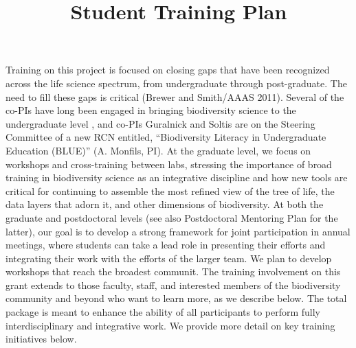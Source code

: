 \documentclass[11pt]{article}
\title{Student Training Plan \vspace{-2ex}}
\author{}
\date{}
\begin{document}
\maketitle
\thispagestyle{fancy} 
\vspace{-6em}


Training on this project is focused on closing gaps that have been
recognized across the life science spectrum, from undergraduate
through post-graduate.  The need to fill these gaps is critical
(Brewer and Smith/AAAS 2011). Several of the co-PIs have long been
engaged in bringing biodiversity science to the undergraduate level
\citep[e.g.,][]{cook2014, lacey2017}, and co-PIs Guralnick and
Soltis are on the Steering Committee of a new RCN entitled,
``Biodiversity Literacy in Undergraduate Education (BLUE)''
(A. Monfils, PI). At the graduate level, we focus on workshops and
cross-training between labs, stressing the importance of broad
training in biodiversity science as an integrative discipline and how
new tools are critical for continuing to assemble the most refined
view of the tree of life, the data layers that adorn it, and other
dimensions of biodiversity.  At both the graduate and postdoctoral
levels (see also Postdoctoral Mentoring Plan for the latter), our goal
is to develop a strong framework for joint participation in annual
meetings, where students can take a lead role in presenting their
efforts and integrating their work with the efforts of the larger
team.  We plan to develop workshops that reach the broadest communit.
The training involvement on this grant extends to those faculty,
staff, and interested members of the biodiversity community and beyond
who want to learn more, as we describe below. The total package is
meant to enhance the ability of all participants to perform fully
interdisciplinary and integrative work.  We provide more detail on key
training initiatives below.
\end{document}
